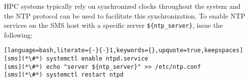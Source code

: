 HPC systems typically rely on synchronized clocks throughout the system and the
NTP protocol can be used to facilitate this synchronization. To enable NTP
services on the SMS host with a specific server \texttt{\$\{ntp\_server\}},
issue the following:

\begin{lstlisting}[language=bash,literate={-}{-}1,keywords={},upquote=true,keepspaces]
[sms](*\#*) systemctl enable ntpd.service
[sms](*\#*) echo "server ${ntp_server}" >> /etc/ntp.conf
[sms](*\#*) systemctl restart ntpd
\end{lstlisting}
